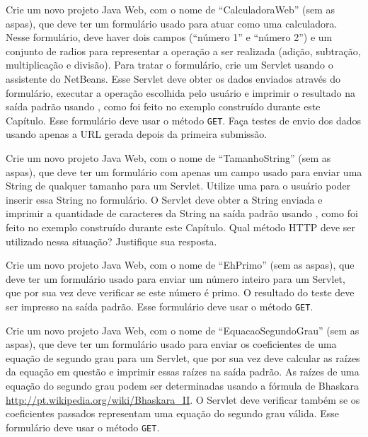 \begin{projetoSemArquivo}{}{}{}
    Crie um novo projeto Java Web, com o nome de ``CalculadoraWeb'' (sem as aspas), que deve ter um formulário usado para atuar como uma calculadora. Nesse formulário, deve haver dois campos (``número 1'' e ``número 2'') e um conjunto de radios para representar a operação a ser realizada (adição, subtração, multiplicação e divisão). Para tratar o formulário, crie um Servlet usando o assistente do NetBeans. Esse Servlet deve obter os dados enviados através do formulário, executar a operação escolhida pelo usuário e imprimir o resultado na saída padrão usando , como foi feito no exemplo construído durante este Capítulo. Esse formulário deve usar o método \texttt{GET}. Faça testes de envio dos dados usando apenas a URL gerada depois da primeira submissão.
\end{projetoSemArquivo}

\begin{projetoSemArquivo}{}{}{}
    Crie um novo projeto Java Web, com o nome de ``TamanhoString'' (sem as aspas), que deve ter um formulário com apenas um campo usado para enviar uma String de qualquer tamanho para um Servlet. Utilize uma  para o usuário poder inserir essa String no formulário. O Servlet deve obter a String enviada e imprimir a quantidade de caracteres da String na saída padrão usando , como foi feito no exemplo construído durante este Capítulo. Qual método HTTP deve ser utilizado nessa situação? Justifique sua resposta.
\end{projetoSemArquivo}

\begin{projetoSemArquivo}{}{}{}
    Crie um novo projeto Java Web, com o nome de ``EhPrimo'' (sem as aspas), que deve ter um formulário usado para enviar um número inteiro para um Servlet, que por sua vez deve verificar se este número é primo. O resultado do teste deve ser impresso na saída padrão. Esse formulário deve usar o método \texttt{GET}.
\end{projetoSemArquivo}

\begin{projetoSemArquivo}{}{}{}
    Crie um novo projeto Java Web, com o nome de ``EquacaoSegundoGrau'' (sem as aspas), que deve ter um formulário usado para enviar os coeficientes de uma equação de segundo grau para um Servlet, que por sua vez deve calcular as raízes da equação em questão e imprimir essas raízes na saída padrão. As raízes de uma equação do segundo grau podem ser determinadas usando a fórmula de Bhaskara \url{http://pt.wikipedia.org/wiki/Bhaskara_II}. O Servlet deve verificar também se os coeficientes passados representam uma equação do segundo grau válida. Esse formulário deve usar o método \texttt{GET}.
\end{projetoSemArquivo}
